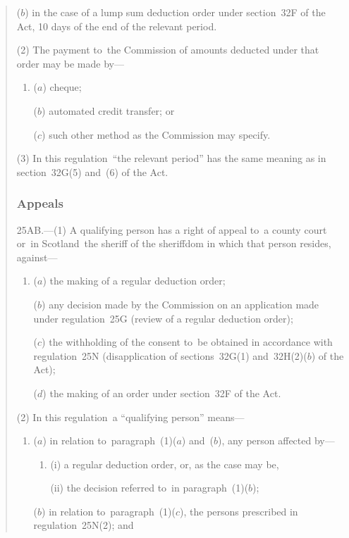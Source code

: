 \documentclass[12pt,a4paper]{article}
\begin{document}
\begin{quotation}
\begin{enumerate}
($b$) in the case of a lump sum deduction order under section~32F of the Act, 10 days of the end of the relevant period.
\end{enumerate}

(2) The payment to~the Commission of amounts deducted under that order may be made by—
\begin{enumerate}\item[]
($a$) cheque;

($b$) automated credit transfer; or

($c$) such other method as the Commission may specify.
\end{enumerate}

(3) In this regulation~“the relevant period” has the same meaning as in section~32G(5) and~(6) of the Act.

\subsubsection*{Appeals}

25AB.---(1)  A qualifying person has a right of appeal to~a county court or~in Scotland~the sheriff of the sheriffdom in which that person resides, against—
\begin{enumerate}\item[]
($a$) the making of a regular deduction order;

($b$) any decision made by the Commission on an application made under regulation~25G (review of a regular deduction order);

($c$) the withholding of the consent to~be obtained in accordance with regulation~25N (disapplication of sections~32G(1) and~32H(2)($b$)  of the Act);

($d$) the making of an order under section~32F of the Act.
\end{enumerate}

(2) In this regulation~a “qualifying person” means—
\begin{enumerate}\item[]
($a$) in relation to~paragraph~(1)($a$)  and~($b$), any person affected by—
\begin{enumerate}\item[]
(i) a regular deduction order, or, as the case may be,

(ii) the decision referred to~in paragraph~(1)($b$);
\end{enumerate}

($b$) in relation to~paragraph~(1)($c$), the persons prescribed in regulation~25N(2); and


\end{enumerate}
\end{quotation}
\end{document}

